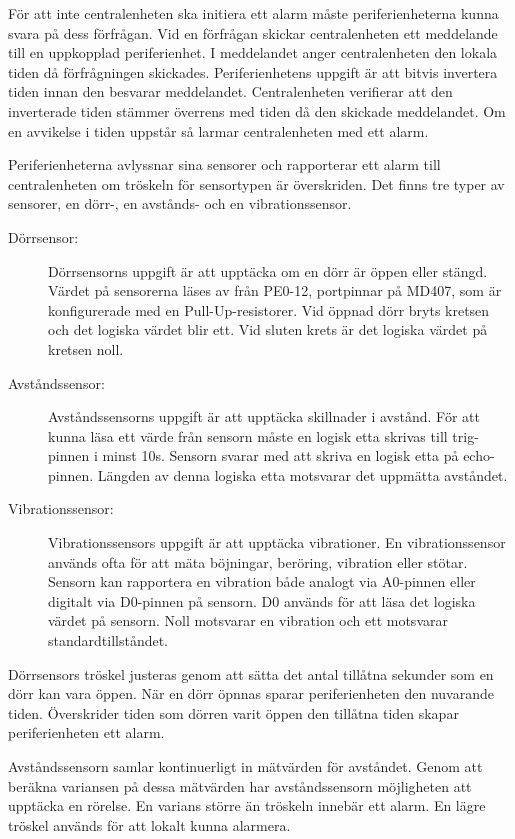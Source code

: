 \documentclass[a4paper]{article}
\begin{document}
För att inte centralenheten ska initiera ett alarm måste periferienheterna kunna svara på dess förfrågan.
Vid en förfrågan skickar centralenheten ett meddelande till en uppkopplad periferienhet.
I meddelandet anger centralenheten den lokala tiden då förfrågningen skickades.
Periferienhetens uppgift är att bitvis invertera tiden innan den besvarar meddelandet.
Centralenheten verifierar att den inverterade tiden stämmer överrens med tiden då den skickade meddelandet.
Om en avvikelse i tiden uppstår så larmar centralenheten med ett alarm.

Periferienheterna avlyssnar sina sensorer och rapporterar ett alarm till centralenheten om tröskeln för sensortypen är överskriden.
Det finns tre typer av sensorer, en dörr-, en avstånds- och en vibrationssensor.

\begin{description}
    \item[Dörrsensor:] Dörrsensorns uppgift är att upptäcka om en dörr är öppen eller stängd.
    Värdet på sensorerna läses av från PE0-12, portpinnar på MD407, som är konfigurerade med en Pull-Up-resistorer.
    Vid öppnad dörr bryts kretsen och det logiska värdet blir ett.
    Vid sluten krets är det logiska värdet på kretsen noll.

    \item[Avståndssensor:] Avståndssensorns uppgift är att upptäcka skillnader i avstånd.
    För att kunna läsa ett värde från sensorn måste en logisk etta skrivas till trig-pinnen i minst 10\textmu s.
    Sensorn svarar med att skriva en logisk etta på echo-pinnen.
    Längden av denna logiska etta motsvarar det uppmätta avståndet.

    \item[Vibrationssensor:] Vibrationssensors uppgift är att upptäcka vibrationer.
    En vibrationssensor används ofta för att mäta böjningar, beröring, vibration eller stötar.
    Sensorn kan rapportera en vibration både analogt via A0-pinnen eller digitalt via D0-pinnen på sensorn.
    D0 används för att läsa det logiska värdet på sensorn.
    Noll motsvarar en vibration och ett motsvarar standardtillståndet.
\end{description}

Dörrsensors tröskel justeras genom att sätta det antal tillåtna sekunder som en dörr kan vara öppen.
När en dörr öpnnas sparar periferienheten den nuvarande tiden.
Överskrider tiden som dörren varit öppen den tillåtna tiden skapar periferienheten ett alarm.

Avståndssensorn samlar kontinuerligt in mätvärden för avståndet.
Genom att beräkna variansen på dessa mätvärden har avståndssensorn möjligheten att upptäcka en rörelse.
En varians större än tröskeln innebär ett alarm.
En lägre tröskel används för att lokalt kunna alarmera.
\end{document}
